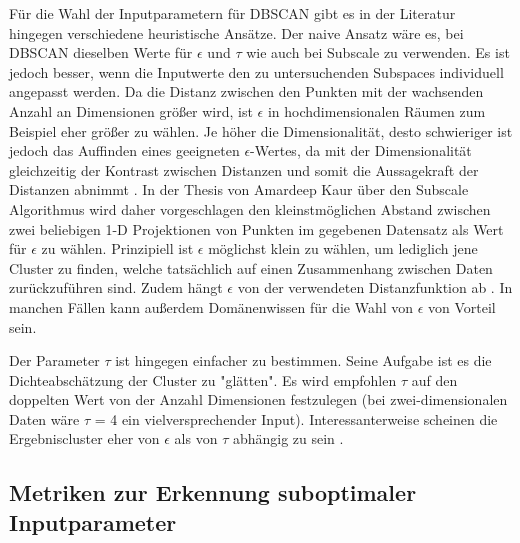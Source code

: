 \documentclass[utf8,biblatex]{lni}
\begin{document}
Für die Wahl der Inputparametern für DBSCAN gibt es in der Literatur hingegen verschiedene heuristische Ansätze.
Der naive Ansatz wäre es, bei DBSCAN dieselben Werte für $\epsilon$ und $\tau$ wie auch bei Subscale zu verwenden.
Es ist jedoch besser, wenn die Inputwerte den zu untersuchenden Subspaces individuell angepasst werden.
Da die Distanz zwischen den Punkten mit der wachsenden Anzahl an Dimensionen größer wird,
ist $\epsilon$ in hochdimensionalen Räumen zum Beispiel eher größer zu wählen.
Je höher die Dimensionalität, desto schwieriger ist jedoch das Auffinden eines geeigneten $\epsilon$-Wertes,
da mit der Dimensionalität gleichzeitig der Kontrast zwischen Distanzen und somit die Aussagekraft der Distanzen abnimmt \cite{TODS4203-19}.
In der Thesis von Amardeep Kaur über den Subscale Algorithmus \cite{thesis} wird daher vorgeschlagen den kleinstmöglichen Abstand
zwischen zwei beliebigen 1-D Projektionen von Punkten im gegebenen Datensatz als Wert für $\epsilon$ zu wählen.
Prinzipiell ist $\epsilon$ möglichst klein zu wählen, um lediglich jene Cluster zu finden,
welche tatsächlich auf einen Zusammenhang zwischen Daten zurückzuführen sind. Zudem hängt $\epsilon$
von der verwendeten Distanzfunktion ab \cite{TODS4203-19}.
In manchen Fällen kann außerdem Domänenwissen für die Wahl von $\epsilon$ von Vorteil sein.

Der Parameter $\tau$ ist hingegen einfacher zu bestimmen.
Seine Aufgabe ist es die Dichteabschätzung der Cluster zu "glätten".
Es wird empfohlen $\tau$ auf den doppelten Wert von der Anzahl Dimensionen festzulegen (bei zwei-dimensionalen Daten
wäre $\tau$ = 4 ein vielversprechender Input).
Interessanterweise scheinen die Ergebniscluster eher von $\epsilon$ als von $\tau$ abhängig zu sein \cite{TODS4203-19}.

\subsection{Metriken zur Erkennung suboptimaler Inputparameter}


\printbibliography
\end{document}
